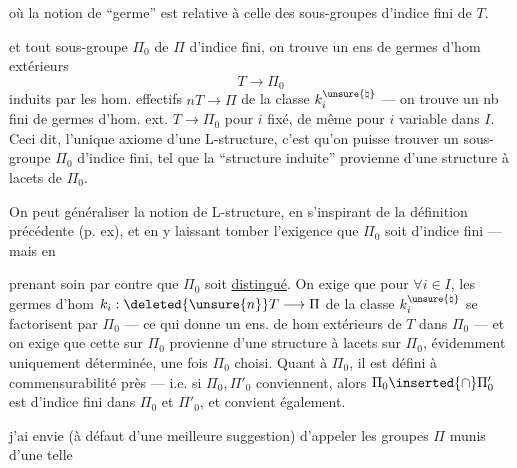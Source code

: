 où la notion de ``germe'' est relative à celle des sous-groupes d'indice fini de $T$.  

et tout sous-groupe  $\Pi_0$ de $\Pi$ d'indice fini, on trouve  un ens de germes d'hom extérieurs
\[
T\longrightarrow\Pi_0
\]
induits par les hom.  effectifs $nT\longrightarrow\Pi$ de la classe $k_i^{\unsure{\natural}}$ --- on trouve un nb fini de germes d'hom. ext. $T\longrightarrow\Pi_0$ pour $i$ fixé, de même pour $i$ variable dans $I$. Ceci dit, l'unique axiome d'une L-structure, c'est qu'on puisse trouver un sous-groupe $\Pi_0$ d'indice fini, tel que la ``structure induite'' provienne d'une structure à lacets de $\Pi_0$.

On peut généraliser la notion de L-structure, en s'inspirant de la définition précédente (p. ex), et en y laissant tomber l'exigence que $\Pi_0$ soit d'indice fini --- mais en

prenant soin par contre que $\Pi_0$ soit \uline{distingué}. On exige que  pour $\forall i\in I$, les germes d'hom $k_i:\deleted{\unsure{n}}T\longrightarrow\Pi$ de la classe $k_i^{\unsure{\natural}}$ se factorisent par $\Pi_0$ --- ce qui donne un ens. de hom extérieurs de $T$ dans $\Pi_0$ ---
et on exige que cette   sur $\Pi_0$ provienne  d'une structure à lacets sur $\Pi_0$, \unsure{$\xi$|\&} évidemment uniquement déterminée, une fois $\Pi_0$ choisi. Quant à $\Pi_0$, il est défini à commensurabilité près --- i.e. si $\Pi_0,\Pi'_0$ conviennent, alors $\Pi_0\inserted{\cap}\Pi'_0$ est d'indice fini dans $\Pi_0$ et $\Pi'_0$, et convient également.

 j'ai envie (à défaut d'une meilleure suggestion) d'appeler les groupes $\Pi$ munis d'une telle

